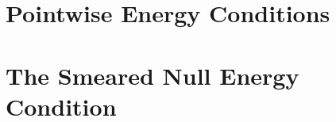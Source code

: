 
\section{Pointwise Energy Conditions}

\section{The Smeared Null Energy Condition}
\label{sec:SNEC}
	
	
	
	
	

	
	
	
	
	



